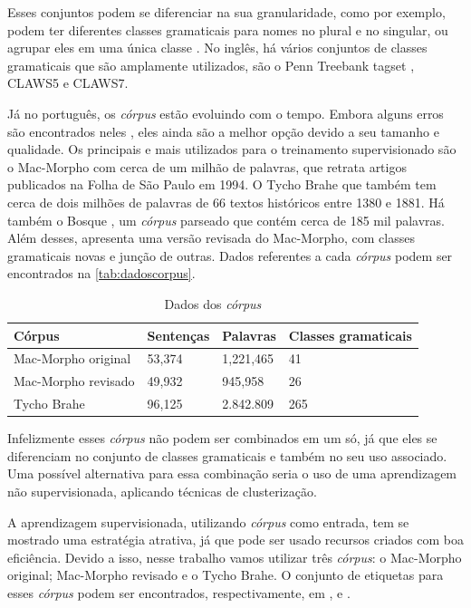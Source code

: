 Esses conjuntos podem se diferenciar na sua granularidade, como por exemplo, podem ter diferentes classes gramaticais para nomes no plural e no singular, ou agrupar eles em uma única classe \cite{fonseca2015evaluating}. No inglês, há vários conjuntos de classes gramaticais que são amplamente utilizados, são o Penn Treebank tagset \cite{penntreebank}, CLAWS5 e CLAWS7.

Já no português, os \textit{córpus} estão evoluindo com o tempo. Embora alguns erros são encontrados neles \cite{fonseca2013mac}, eles ainda são a melhor opção devido a seu tamanho e qualidade. Os principais e mais utilizados para o treinamento supervisionado são o Mac-Morpho \cite{aluisio2003account} com cerca de um milhão de palavras, que retrata artigos publicados na Folha de São Paulo em 1994. O Tycho Brahe \cite{tychobrahe2010corpus} que também tem cerca de dois milhões de palavras de 66 textos históricos entre 1380 e 1881. Há também o Bosque \cite{afonso2002floresta}, um \textit{córpus} parseado que contém cerca de 185 mil palavras. Além desses, \cite{fonseca2015evaluating} apresenta uma versão revisada do Mac-Morpho, com classes gramaticais novas e junção de outras. Dados referentes a cada \textit{córpus} podem ser encontrados na \autoref{tab:dadoscorpus}.

\begin{table}[!htb]
\footnotesize
\centering
\caption{Dados dos \textit{córpus}}
\label{tab:dadoscorpus}
\begin{tabular}{m{4cm}m{2cm}m{2cm}m{4cm}}
  \toprule
  \textbf{Córpus} & \textbf{Sentenças}  & \textbf{Palavras}  & \textbf{Classes gramaticais}  \\
  \midrule
  Mac-Morpho original & 53,374 & 1,221,465 & 41  \\
  Mac-Morpho revisado & 49,932 & 945,958   & 26  \\
  Tycho Brahe         & 96,125 & 2.842.809 & 265 \\
  \bottomrule
\end{tabular}
\end{table}

Infelizmente esses \textit{córpus} não podem ser combinados em um só, já que eles se diferenciam no conjunto de classes gramaticais e também no seu uso associado. Uma possível alternativa para essa combinação seria o uso de uma aprendizagem não supervisionada, aplicando técnicas de clusterização.

A aprendizagem supervisionada, utilizando \textit{córpus} como entrada, tem se mostrado uma estratégia atrativa, já que pode ser usado recursos criados com boa eficiência. Devido a isso, nesse trabalho vamos utilizar três \textit{córpus}: o Mac-Morpho original; Mac-Morpho revisado e o Tycho Brahe. O conjunto de etiquetas para esses \textit{córpus} podem ser encontrados, respectivamente, em \cite{aluisio2003account}, \cite{fonseca2015evaluating} e \cite{tychobrahe2010corpus}.



